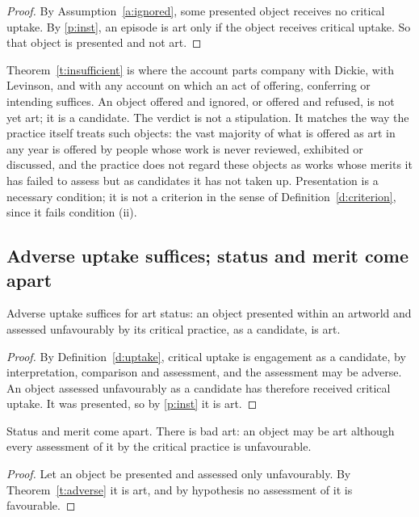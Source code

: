 \documentclass{situationist-preprint}
\begin{document}
\begin{proof}
By Assumption~\ref{a:ignored}, some presented object receives no critical uptake. By \ref{p:inst}, an episode is art only if the object receives critical uptake. So that object is presented and not art.
\end{proof}

Theorem~\ref{t:insufficient} is where the account parts company with Dickie, with Levinson, and with any account on which an act of offering, conferring or intending suffices. An object offered and ignored, or offered and refused, is not yet art; it is a candidate. The verdict is not a stipulation. It matches the way the practice itself treats such objects: the vast majority of what is offered as art in any year is offered by people whose work is never reviewed, exhibited or discussed, and the practice does not regard these objects as works whose merits it has failed to assess but as candidates it has not taken up. Presentation is a necessary condition; it is not a criterion in the sense of Definition~\ref{d:criterion}, since it fails condition (ii).

\subsection{Adverse uptake suffices; status and merit come apart}

\begin{theorem}\label{t:adverse}
Adverse uptake suffices for art status: an object presented within an artworld and assessed unfavourably by its critical practice, as a candidate, is art.
\end{theorem}

\begin{proof}
By Definition~\ref{d:uptake}, critical uptake is engagement as a candidate, by interpretation, comparison and assessment, and the assessment may be adverse. An object assessed unfavourably as a candidate has therefore received critical uptake. It was presented, so by \ref{p:inst} it is art.
\end{proof}

\begin{corollary}\label{c:merit}
Status and merit come apart. There is bad art: an object may be art although every assessment of it by the critical practice is unfavourable.
\end{corollary}

\begin{proof}
Let an object be presented and assessed only unfavourably. By Theorem~\ref{t:adverse} it is art, and by hypothesis no assessment of it is favourable.
\end{proof}
\end{document}
